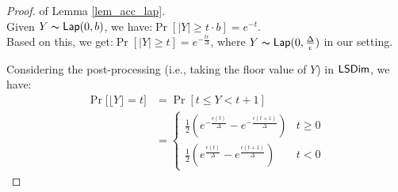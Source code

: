 \documentclass{article}
\begin{document}
\begin{proof} of Lemma \ref{lem_acc_lap}.\\
Given $Y \thicksim \mathsf{Lap}(0, b)$, we have\cite{dwork2014algorithmic}:$\Pr[|Y| \geq t \cdot b] = e^{- t}.$\\
Based on this, we get:$\Pr[|Y| \geq t] = e^{- \frac{t \epsilon}{\Delta }}$, where $Y \thicksim \mathsf{Lap}(0, \frac{\Delta }{\epsilon})$ in our setting.

Considering the post-processing (i.e., taking the floor value of $Y$) in $\mathsf{LSDim}$, we have:
\begin{align*}
\Pr\big[\lfloor Y \rfloor = t\big]&= \Pr[ t \leq Y < t + 1]\\
&= 
\begin{cases}
\frac{1}{2} (e^{- \frac{\epsilon (t)}{\Delta }} - e^{- \frac{\epsilon (t + 1)}{\Delta }}) &  t \geq 0\\
\frac{1}{2} (e^{\frac{\epsilon (t)}{\Delta }} - e^{\frac{\epsilon (t + 1)}{\Delta }}) & t < 0
\end{cases}
\end{align*}


\end{proof}
\end{document}
